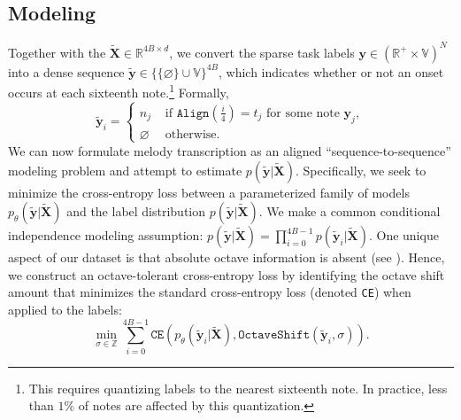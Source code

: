 \subsection{Modeling}
\label{sec:modeling}

Together with the \beatpooling{} ${\tilde{\bm{X}} \in \mathbb{R}^{4B\times d}}$, we convert 
the sparse task labels ${\bm{y} \in (\mathbb{R}^+ \times \mathbb{V})^N}$ into 
a dense sequence  
${\tilde{\bm{y}} \in \{\{\varnothing\}\cup\mathbb{V}\}^{4B}}$,
which indicates whether or not an onset occurs at each sixteenth note.\footnote{This requires quantizing labels to the nearest sixteenth note. In practice, less than $1\%$ of notes are affected by this quantization.} Formally, 
\[
\tilde{\bm{y}}_i =
\begin{cases}
n_j & \text{ if $\texttt{Align}(\frac{i}{4}) = t_j$ for some note $\bm{y}_j$}, \\
\varnothing & \text{ otherwise}.
\end{cases}
\]
We can now formulate melody transcription as an aligned ``sequence-to-sequence'' modeling problem and attempt to estimate $p(\tilde{\bm{y}}|\tilde{\bm{X}})$. Specifically, we seek to minimize the cross-entropy loss between a parameterized family of models $p_\theta(\tilde{\bm{y}}|\tilde{\bm{X}})$ and the label distribution $p(\tilde{\bm{y}}|\tilde{\bm{X}})$.
We make a common conditional independence modeling assumption: ${p(\tilde {\bm{y}}|\tilde{\bm{X}}) = \prod_{i=0}^{4B-1} p(\tilde{\bm{y}}_i|\tilde{\bm{X}})}$.
One unique aspect of our dataset is that absolute octave information is absent (see ). 
Hence, we construct an octave-tolerant cross-entropy loss by 
identifying the octave shift amount that minimizes the standard cross-entropy loss (denoted \texttt{CE}) when applied to the labels:
\begin{equation*}
\operatorname*{min}_{\sigma \in \mathbb{Z}} \sum_{i=0}^{4B-1} \texttt{CE}(p_\theta(\tilde{\bm{y}}_i|\bm{\tilde{X}}), \texttt{OctaveShift}(\tilde{\bm{y}}_i, \sigma)).
\end{equation*}

